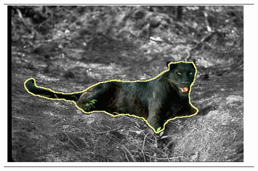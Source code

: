 \begin{frame}
\begin{tabular}{cc}
\includegraphics[scale=0.28]{figures/non-submodular-elastica/contour-correction/corrected-seg-panther.png}
\end{tabular}
\end{frame}

